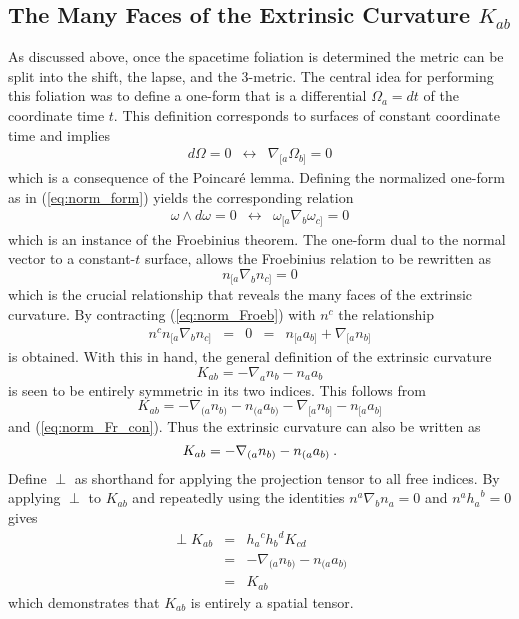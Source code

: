 \subsection{The Many Faces of the Extrinsic Curvature $K_{ab}$}\label{S:K_faces}

As discussed above, once the spacetime foliation is determined the metric can
be split into the shift, the lapse, and the 3-metric.  The central idea for
performing this foliation was to define a one-form that is a differential
$\Omega_a = dt$ of the coordinate time $t$.  This definition corresponds to
surfaces of constant coordinate time and implies
\[
  \begin{array}{ccc}
    d \Omega = 0 & \leftrightarrow & \nabla_{[a} \Omega_{b]} = 0
  \end{array}
\]
which is a consequence of the Poincar\'{e} lemma.  Defining the normalized
one-form as in (\ref{eq:norm_form}) yields the corresponding relation
\[
  \begin{array}{ccc}
    \omega \wedge d \omega = 0 & \leftrightarrow & \omega_{[a}
    \nabla_{b} \omega_{c]} = 0
  \end{array}
\]
which is an instance of the Froebinius theorem.  The one-form dual to the
normal vector to a constant-$t$ surface, allows the Froebinius relation
to be rewritten as
\begin{equation}\label{eq:norm_Froeb}
  n_{[a} \nabla_{b} n_{c]} = 0
\end{equation}
which is the crucial relationship that reveals the many faces of the
extrinsic curvature.  By contracting (\ref{eq:norm_Froeb}) with $n^c$ the
relationship
\begin{equation}\label{eq:norm_Fr_con}
 \begin{array}{ccccc}
  n^c n_{[a} \nabla_{b} n_{c]} & = & 0 & = & n_{[a} a_{b]} + \nabla_{[a} n_{b]}
 \end{array}
\end{equation}
is obtained.  With this in hand, the general definition of the extrinsic
curvature
\[
   K_{ab} = -\nabla_{a} n_{b} - n_{a} a_{b}
\]
is seen to be entirely symmetric in its two indices.  This follows from
\[
   K_{ab} = -\nabla_{(a} n_{b)} - n_{(a} a_{b)} -\nabla_{[a} n_{b]} - n_{[a} a_{b]}
\]
and (\ref{eq:norm_Fr_con}).  Thus the extrinsic curvature can also be written as
\[
   K_{ab}  =  -\nabla_{(a} n_{b)} - n_{(a}a_{b)} \: .
\]
Define $\perp$ as shorthand for applying the projection tensor to all free
indices.  By applying $\perp$ to $K_{ab}$ and repeatedly using the identities
$n^a \nabla_b n_a = 0$ and $n^a {h_a}^b = 0$gives
\begin{eqnarray*}
   \perp K_{ab} & = & {h_a}^c {h_b}^d K_{cd} \\
                & = & -\nabla_{(a} n_{b)} - n_{(a} a_{b)} \\
                & = & K_{ab}
\end{eqnarray*}
which demonstrates that $K_{ab}$ is entirely a spatial tensor.

